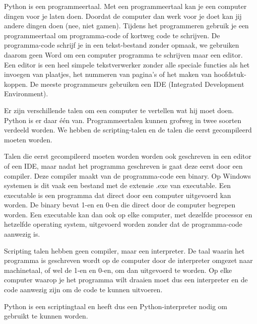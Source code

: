 Python is een programmeertaal. Met een programmeertaal kan je een computer dingen voor je laten doen. Doordat de computer dan werk voor je doet kan jij andere dingen doen (nee, niet gamen). Tijdens het programmeren gebruik je een programmeertaal om programma-code of kortweg code te schrijven. De programma-code schrijf je in een tekst-bestand zonder opmaak, we gebruiken daarom geen Word om een computer programma te schrijven maar een editor. Een editor is een heel simpele tekstverwerker zonder alle speciale functies als het invoegen van plaatjes, het nummeren van pagina's of het maken van hoofdstuk-koppen. De meeste programmeurs gebruiken een IDE (Integrated Development Environment).

Er zijn verschillende talen om een computer te vertellen wat hij moet doen. Python is er daar \'e\'en van. Programmeertalen kunnen grofweg in twee soorten verdeeld worden. We hebben de scripting-talen en de talen die eerst gecompileerd moeten worden.

Talen die eerst gecompileerd moeten worden worden ook geschreven in een editor of een IDE, maar nadat het programma geschreven is gaat deze eerst door een compiler. Deze compiler maakt van de programma-code een binary. Op Windows systemen is dit vaak een bestand met de extensie .exe van executable. Een executable is een programma dat direct door een computer uitgevoerd kan worden. De binary bevat 1-en en 0-en die direct door de computer begrepen worden. Een executable kan dan ook op elke computer, met dezelfde processor en hetzelfde operating system, uitgevoerd worden zonder dat de programma-code aanwezig is.

Scripting talen hebben geen compiler, maar een interpreter. De taal waarin het programma is geschreven wordt op de computer door de interpreter omgezet naar machinetaal, of wel de 1-en en 0-en, om dan uitgevoerd te worden. Op elke computer waarop je het programma wilt draaien moet dus een interpreter en de code aanwezig zijn om de code te kunnen uitvoeren.

Python is een scriptingtaal en heeft dus een Python-interpreter nodig om gebruikt te kunnen worden.
